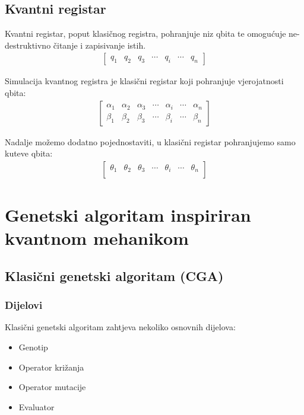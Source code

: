 \documentclass[times, utf8, zavrsni]{fer}
\begin{document}
\section{Kvantni registar}
Kvantni registar, poput klasičnog registra, pohranjuje niz qbita te omogućuje ne-destruktivno čitanje i zapisivanje istih.
\begin{align*}
\begin{bmatrix}
q_1 & q_2 & q_3 & \cdots & q_i & \cdots & q_n
\end{bmatrix}
\end{align*}

Simulacija kvantnog registra je klasični registar koji pohranjuje vjerojatnosti qbita:
\begin{align*}
\begin{bmatrix}
\alpha_1 & \alpha_2 & \alpha_3 & \cdots & \alpha_i & \cdots & \alpha_n \\
\beta_1 & \beta_2 & \beta_3 & \cdots & \beta_i & \cdots & \beta_n
\end{bmatrix}
\end{align*}

Nadalje možemo dodatno pojednostaviti, u klasični registar pohranjujemo samo kuteve qbita:
\begin{align*}
\begin{bmatrix}
\theta_1 & \theta_2 & \theta_3 & \cdots & \theta_i & \cdots & \theta_n \\
\end{bmatrix}
\end{align*}



\chapter{Genetski algoritam inspiriran kvantnom mehanikom}
\section{Klasični genetski algoritam (CGA)}
\subsection{Dijelovi}
Klasični genetski algoritam zahtjeva nekoliko osnovnih dijelova:
\begin{itemize}
\item Genotip 
\item Operator križanja 
\item Operator mutacije
\item Evaluator 
\end{itemize}
\end{document}
